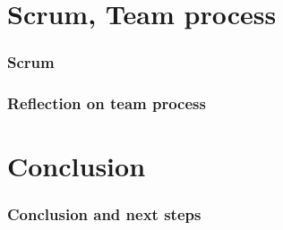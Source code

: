\section{Scrum, Team process}

\begin{frame}
  \frametitle{Scrum}
\end{frame}

\begin{frame}
  \frametitle{Reflection on team process}
\end{frame}

\section{Conclusion}

\begin{frame}
  \frametitle{Conclusion and next steps}
\end{frame}


